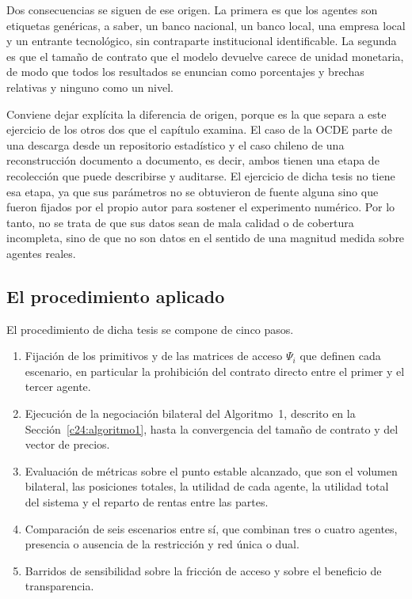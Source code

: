 Dos consecuencias se siguen de ese origen. La primera es que los agentes son etiquetas genéricas, a saber, un banco nacional, un banco local, una empresa local y un entrante tecnológico, sin contraparte institucional identificable. La segunda es que el tamaño de contrato que el modelo devuelve carece de unidad monetaria, de modo que todos los resultados se enuncian como porcentajes y brechas relativas y ninguno como un nivel.

Conviene dejar explícita la diferencia de origen, porque es la que separa a este ejercicio de los otros dos que el capítulo examina. El caso de la OCDE parte de una descarga desde un repositorio estadístico y el caso chileno de una reconstrucción documento a documento, es decir, ambos tienen una etapa de recolección que puede describirse y auditarse. El ejercicio de dicha tesis no tiene esa etapa, ya que sus parámetros no se obtuvieron de fuente alguna sino que fueron fijados por el propio autor para sostener el experimento numérico. Por lo tanto, no se trata de que sus datos sean de mala calidad o de cobertura incompleta, sino de que no son datos en el sentido de una magnitud medida sobre agentes reales.

\subsection{El procedimiento aplicado}
\label{c4:venegas-procedimiento}

El procedimiento de dicha tesis se compone de cinco pasos.

\begin{enumerate}
    \item Fijación de los primitivos y de las matrices de acceso $\Psi_i$ que
    definen cada escenario, en particular la prohibición del contrato directo
    entre el primer y el tercer agente.
    \item Ejecución de la negociación bilateral del Algoritmo~1, descrito en la
    Sección~\ref{c24:algoritmo1}, hasta la convergencia del tamaño de contrato y
    del vector de precios.
    \item Evaluación de métricas sobre el punto estable alcanzado, que son el
    volumen bilateral, las posiciones totales, la utilidad de cada agente, la
    utilidad total del sistema y el reparto de rentas entre las partes.
    \item Comparación de seis escenarios entre sí, que combinan tres o cuatro
    agentes, presencia o ausencia de la restricción y red única o dual.
    \item Barridos de sensibilidad sobre la fricción de acceso y sobre el
    beneficio de transparencia.
\end{enumerate}

